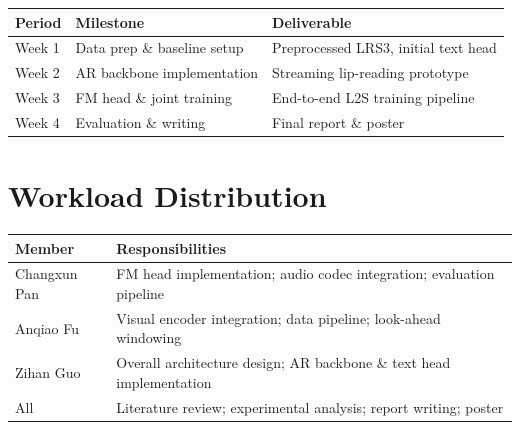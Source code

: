 \documentclass{article}
\begin{document}
\begin{table}[h]
\centering
\small
\begin{tabular}{@{}lll@{}}
\toprule
\textbf{Period} & \textbf{Milestone} & \textbf{Deliverable} \\
\midrule
Week 1 & Data prep \& baseline setup & Preprocessed LRS3, initial text head \\
Week 2 & AR backbone implementation & Streaming lip-reading prototype \\
Week 3 & FM head \& joint training & End-to-end L2S training pipeline \\
Week 4 & Evaluation \& writing & Final report \& poster \\
\bottomrule
\end{tabular}
\end{table}

\section{Workload Distribution}

\begin{table}[h]
\centering
\small
\begin{tabular}{@{}ll@{}}
\toprule
\textbf{Member} & \textbf{Responsibilities} \\
\midrule
Changxun Pan & FM head implementation; audio codec integration; evaluation pipeline \\
Anqiao Fu & Visual encoder integration; data pipeline; look-ahead windowing \\
Zihan Guo & Overall architecture design; AR backbone \& text head implementation \\
\midrule
All & Literature review; experimental analysis; report writing; poster \\
\bottomrule
\end{tabular}
\end{table}



\end{document}
